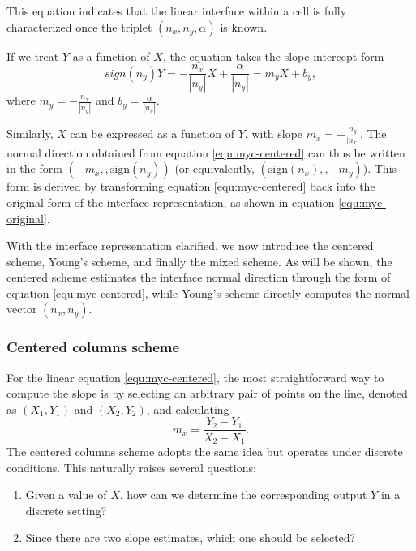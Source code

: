 This equation indicates that the linear interface within a cell is fully characterized once the triplet $(n_x, n_y, \alpha)$ is known.

If we treat $Y$ as a function of $X$, the equation takes the slope-intercept form
\begin{equation}\label{equ:myc-centered}
  sign(n_y)Y = -\frac{n_x}{|n_y|} X + \frac{\alpha}{|n_y|} = m_y X + b_y,
\end{equation}
where $m_y = -\frac{n_x}{|n_y|}$ and $b_y = \frac{\alpha}{|n_y|}$.

Similarly, $X$ can be expressed as a function of $Y$, with slope $m_x = -\frac{n_y}{|n_x|}$. The normal direction obtained from equation \ref{equ:myc-centered} can thus be written in the form $(-m_x,, \text{sign}(n_y))$ (or equivalently, $(\text{sign}(n_x),, -m_y)$). This form is derived by transforming equation \ref{equ:myc-centered} back into the original form of the interface representation, as shown in equation \ref{equ:myc-original}.

With the interface representation clarified, we now introduce the centered scheme, Young’s scheme, and finally the mixed scheme. As will be shown, the centered scheme estimates the interface normal direction through the form of equation \ref{equ:myc-centered}, while Young’s scheme directly computes the normal vector $(n_x, n_y)$.
\subsubsection{Centered columns scheme}

For the linear equation \ref{equ:myc-centered}, the most straightforward way to compute the slope is by selecting an arbitrary pair of points on the line, denoted as $(X_1, Y_1)$ and $(X_2, Y_2)$, and calculating  
\begin{equation}
  m_x = \frac{Y_2 - Y_1}{X_2 - X_1}.
\end{equation}  
The centered columns scheme adopts the same idea but operates under discrete conditions. This naturally raises several questions:  
\begin{enumerate}
  \item Given a value of $X$, how can we determine the corresponding output $Y$ in a discrete setting?
  \item Since there are two slope estimates, which one should be selected?
\end{enumerate}

